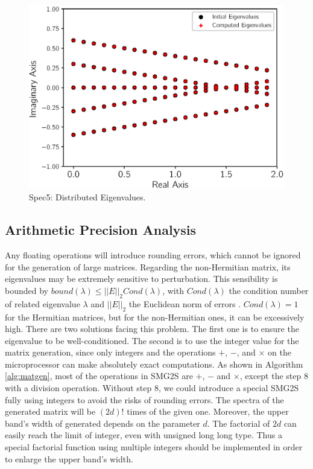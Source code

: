 \begin{figure}[htbp]
	\centering
	\includegraphics[width=5.8in]{fig/matgen/vector4.eps}
	\caption{Spec5: Distributed Eigenvalues.}
	\label{fig_fifth_case}
\end{figure}

\subsection{Arithmetic Precision Analysis}

Any floating operations will introduce rounding errors, which cannot be ignored for the generation of large matrices. Regarding the non-Hermitian matrix, its eigenvalues may be extremely sensitive to perturbation. This sensibility is bounded by $bound(\lambda) \leq ||E||_2Cond(\lambda)$, with $Cond(\lambda)$ the condition number of related eigenvalue $\lambda$ and $||E||_2$ the Euclidean norm of errors \cite{saad2011numerical}. $Cond(\lambda)=1$ for the Hermitian matrices, but for the non-Hermitian ones, it can be excessively high. There are two solutions facing this problem. The first one is to ensure the eigenvalue to be well-conditioned. The second is to use the integer value for the matrix generation, since only integers and the operations $+$, $-$, and $\times$ on the microprocessor can make absolutely exact computations. As shown in Algorithm \ref{alg:matgen}, most of the operations in SMG2S are $+$, $-$ and $\times$, except the step 8 with a division operation. Without step 8, we could introduce a special SMG2S fully using integers to avoid the risks of rounding errors. The spectra of the generated matrix will be $(2d)!$ times of the given one. Moreover, the upper band's width of generated depends on the parameter $d$. The factorial of $2d$ can easily reach the limit of integer, even with unsigned long long type. Thus a special factorial function using multiple integers should be implemented in order to enlarge the upper band's width.

